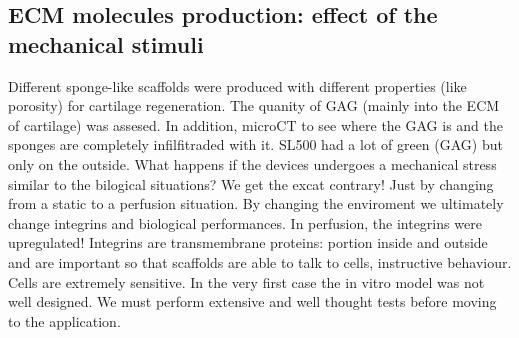 \subsection{ECM molecules production: effect of the mechanical stimuli}
Different sponge-like scaffolds were produced with different properties (like porosity) for cartilage regeneration. 
The quanity of GAG (mainly into the ECM of cartilage) was assesed. In addition, microCT to see where the GAG is and the sponges are completely infilfitraded with it. SL500 had a lot of green (GAG) but only on the outside. What happens if the devices undergoes a mechanical stress similar to the bilogical situations? We get the excat contrary! Just by changing from a static to a perfusion situation. By changing the enviroment we ultimately change integrins and biological performances. In perfusion, the integrins were upregulated! Integrins are transmembrane proteins: portion inside and outside and are important so that scaffolds are able to talk to cells, instructive behaviour. Cells are extremely sensitive. In the very first case the in vitro model  was not well designed. We must perform extensive and well thought tests before moving to the application. 











